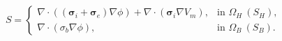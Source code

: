 $$
S = \begin{cases}
\nabla\!\cdot\!\left(\left(\boldsymbol\sigma_i+\boldsymbol\sigma_e\right)\nabla\phi\right) + \nabla\!\cdot\!\left(\boldsymbol\sigma_i\nabla V_m\right), & \text{in }\Omega_H\ (S_H),\\
\nabla\!\cdot\!\left(\sigma_b\nabla\phi\right), & \text{in }\Omega_B\ (S_B).
\end{cases}
$$

